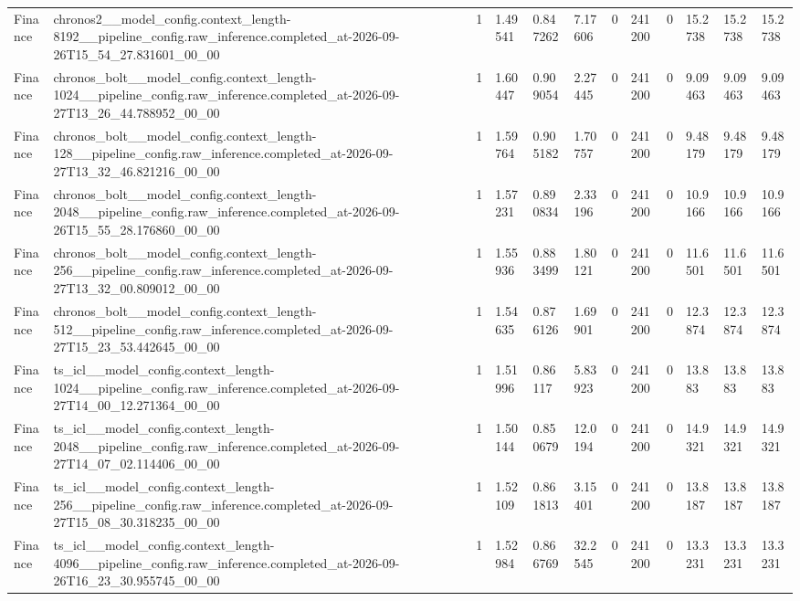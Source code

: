 \begin{tabular}{llllllllllll}
Finance & chronos2\_\_model\_config.context\_length-8192\_\_pipeline\_config.raw\_inference.completed\_at-2026-09-26T15\_54\_27.831601\_00\_00 & 1 & 1.49541 & 0.847262 & 7.17606 & 0 & 241200 & 0 & 15.2738 & 15.2738 & 15.2738 \\
Finance & chronos\_bolt\_\_model\_config.context\_length-1024\_\_pipeline\_config.raw\_inference.completed\_at-2026-09-27T13\_26\_44.788952\_00\_00 & 1 & 1.60447 & 0.909054 & 2.27445 & 0 & 241200 & 0 & 9.09463 & 9.09463 & 9.09463 \\
Finance & chronos\_bolt\_\_model\_config.context\_length-128\_\_pipeline\_config.raw\_inference.completed\_at-2026-09-27T13\_32\_46.821216\_00\_00 & 1 & 1.59764 & 0.905182 & 1.70757 & 0 & 241200 & 0 & 9.48179 & 9.48179 & 9.48179 \\
Finance & chronos\_bolt\_\_model\_config.context\_length-2048\_\_pipeline\_config.raw\_inference.completed\_at-2026-09-26T15\_55\_28.176860\_00\_00 & 1 & 1.57231 & 0.890834 & 2.33196 & 0 & 241200 & 0 & 10.9166 & 10.9166 & 10.9166 \\
Finance & chronos\_bolt\_\_model\_config.context\_length-256\_\_pipeline\_config.raw\_inference.completed\_at-2026-09-27T13\_32\_00.809012\_00\_00 & 1 & 1.55936 & 0.883499 & 1.80121 & 0 & 241200 & 0 & 11.6501 & 11.6501 & 11.6501 \\
Finance & chronos\_bolt\_\_model\_config.context\_length-512\_\_pipeline\_config.raw\_inference.completed\_at-2026-09-27T15\_23\_53.442645\_00\_00 & 1 & 1.54635 & 0.876126 & 1.69901 & 0 & 241200 & 0 & 12.3874 & 12.3874 & 12.3874 \\
Finance & ts\_icl\_\_model\_config.context\_length-1024\_\_pipeline\_config.raw\_inference.completed\_at-2026-09-27T14\_00\_12.271364\_00\_00 & 1 & 1.51996 & 0.86117 & 5.83923 & 0 & 241200 & 0 & 13.883 & 13.883 & 13.883 \\
Finance & ts\_icl\_\_model\_config.context\_length-2048\_\_pipeline\_config.raw\_inference.completed\_at-2026-09-27T14\_07\_02.114406\_00\_00 & 1 & 1.50144 & 0.850679 & 12.0194 & 0 & 241200 & 0 & 14.9321 & 14.9321 & 14.9321 \\
Finance & ts\_icl\_\_model\_config.context\_length-256\_\_pipeline\_config.raw\_inference.completed\_at-2026-09-27T15\_08\_30.318235\_00\_00 & 1 & 1.52109 & 0.861813 & 3.15401 & 0 & 241200 & 0 & 13.8187 & 13.8187 & 13.8187 \\
Finance & ts\_icl\_\_model\_config.context\_length-4096\_\_pipeline\_config.raw\_inference.completed\_at-2026-09-26T16\_23\_30.955745\_00\_00 & 1 & 1.52984 & 0.866769 & 32.2545 & 0 & 241200 & 0 & 13.3231 & 13.3231 & 13.3231 \\

\end{tabular}
